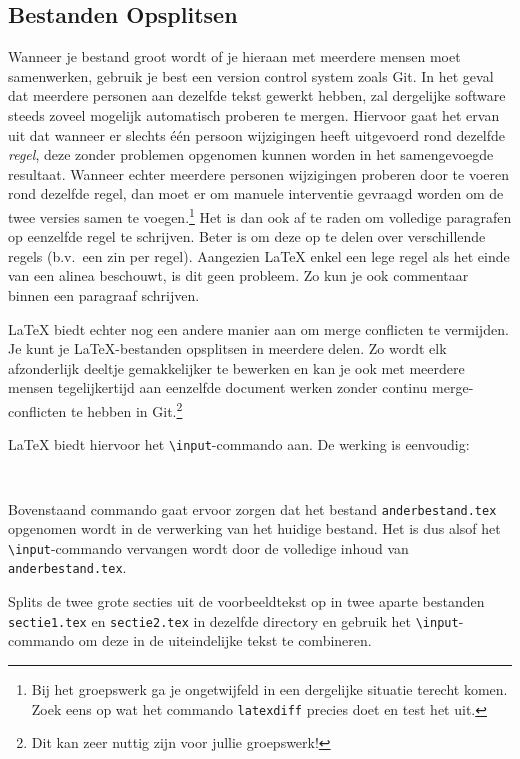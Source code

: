 \documentclass[12pt, dutch]{article}
\newcommand{\bs}{\textbackslash}
\begin{document}
\subsection{Bestanden Opsplitsen}
Wanneer je bestand groot wordt of je hieraan met meerdere mensen moet samenwerken,
gebruik je best een version control system zoals Git.
In het geval dat meerdere personen aan dezelfde tekst gewerkt hebben, zal dergelijke
software steeds zoveel mogelijk automatisch proberen te mergen. Hiervoor gaat het ervan uit
dat wanneer er slechts \'e\'en persoon wijzigingen heeft uitgevoerd rond dezelfde {\em regel}, deze zonder problemen
opgenomen kunnen worden in het samengevoegde resultaat. Wanneer echter meerdere personen
wijzigingen proberen door te voeren rond dezelfde regel, dan moet er om manuele interventie
gevraagd worden om de twee versies samen te voegen.\footnote{Bij het groepswerk ga je ongetwijfeld in een
  dergelijke situatie terecht komen. Zoek eens op wat het commando {\tt latexdiff} precies doet en test het uit.}
Het is dan ook af te raden om volledige paragrafen op eenzelfde
regel te schrijven. Beter is om deze op te delen over verschillende regels
(b.v.\ een zin per regel). Aangezien \LaTeX{} enkel een lege
regel als het einde van een alinea beschouwt, is dit geen probleem. Zo kun
je ook commentaar binnen een paragraaf schrijven.

\LaTeX{} biedt echter nog een andere manier aan om merge conflicten te vermijden.
Je kunt je \LaTeX{}-bestanden opsplitsen in meerdere delen. Zo wordt elk
afzonderlijk deeltje gemakkelijker te bewerken en kan je ook met meerdere
mensen tegelijkertijd aan eenzelfde document werken zonder continu
merge-conflicten te hebben in Git.\footnote{Dit kan zeer nuttig zijn voor jullie groepswerk!}

\LaTeX{} biedt hiervoor het \texttt{\bs{}input}-commando aan.
De werking is eenvoudig:
\begin{verbatim}
 
\end{verbatim}
Bovenstaand commando gaat ervoor zorgen dat het bestand
\texttt{anderbestand.tex} opgenomen wordt in de verwerking van het huidige
bestand. Het is dus alsof het \texttt{\bs{}input}-commando
vervangen wordt door de volledige inhoud van \texttt{anderbestand.tex}.

\begin{tcolorbox}[title=Opgave 5j]
  Splits de twee grote secties uit de voorbeeldtekst op in twee aparte
  bestanden \texttt{sectie1.tex} en \texttt{sectie2.tex} in dezelfde directory en gebruik
  het \texttt{\bs{}input}-commando om deze in de uiteindelijke tekst te combineren.
\end{tcolorbox}
\end{document}
